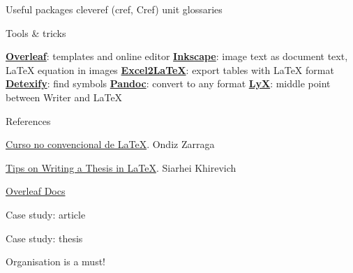 \begin{frame}{Useful packages}
cleveref (cref, Cref)
unit
glossaries

\end{frame}

\begin{frame}{Tools \& tricks}
 \begin{fullpageitemize}
  \itemR \href{https://www.overleaf.com/}{\textbf{Overleaf}}: templates and online editor
  \itemR \href{http://wiki.inkscape.org/wiki/index.php/LaTeX}{\textbf{Inkscape}}: image text as document text, LaTeX equation in images
  \itemR \href{https://www.ctan.org/tex-archive/support/excel2latex/}{\textbf{Excel2LaTeX}}: export tables with LaTeX format
  \itemR \href{http://detexify.kirelabs.org/classify.html}{\textbf{Detexify}}: find symbols
  \itemR \href{http://pandoc.org/}{\textbf{Pandoc}}: convert to any format
  \itemR \href{https://www.lyx.org/}{\textbf{LyX}}: middle point between Writer and LaTeX
\end{fullpageitemize}
 
\end{frame}

\begin{frame}{References}
 \begin{fullpageitemize}
	\itemR\href{https://ondiz.github.io/cursoLatex/}{Curso no convencional de LaTeX}. Ondiz Zarraga

	\itemR \href{http://www.khirevich.com/latex/}{Tips on Writing a Thesis in LaTeX}. Siarhei Khirevich
	
	\itemR \href{https://www.overleaf.com/learn/latex/Main_Page}{Overleaf Docs}
 \end{fullpageitemize}
 
\end{frame}

\begin{frame}{Case study: article}
 
 \begin{fullpageitemize}
	\itemR
 \end{fullpageitemize} 
 
 \note{}
\end{frame}

\begin{frame}{Case study: thesis}
 
 \begin{fullpageitemize}
	\itemR Organisation is a must!
 \end{fullpageitemize} 
 \note{}
\end{frame}


